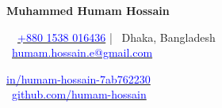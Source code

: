 {\noindent\fontsize{24pt}{29pt}\bfseries Muhammed Humam Hossain\par}
\vspace{0.5em}
\noindent
\begin{minipage}[t]{0.50\textwidth}
    \raggedright
    \faMobile\ \ \href{tel:+8801538016436}{\textcolor{blue}{+880 1538 016436}} | \faMapMarker \ Dhaka, Bangladesh \\ 
    \faEnvelope\ \href{mailto:humam.hossain.e@gmail.com}{\textcolor{blue}{humam.hossain.e@gmail.com}}
\end{minipage}%
\hfill
\begin{minipage}[t]{0.50\textwidth}
    \raggedleft
    \href{https://www.linkedin.com/in/humam-hossain-7ab762230/}{\textcolor{blue}{in/humam-hossain-7ab762230}} \faLinkedin\\\
    \href{https://github.com/humam-hossain}{\textcolor{blue}{github.com/humam-hossain}} \faGithub\
\end{minipage}

\vspace{1.2em}